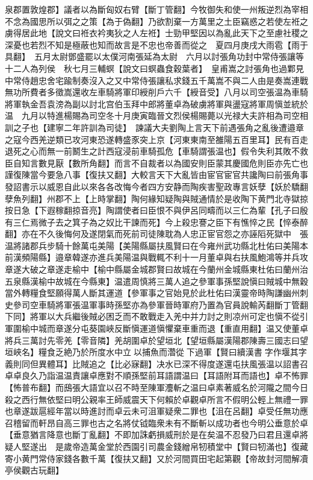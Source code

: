泉郡置敦煌郡】議者以為斷匈奴右臂【斷丁管翻】今牧御失和使一州叛逆烈為宰相不念為國思所以弭之之策【為于偽翻】乃欲割棄一方萬里之土臣竊惑之若使左袵之虜得居此地【說文曰袵衣衿夷狄之人左袵】士勁甲堅因以為亂此天下之至慮社稷之深憂也若烈不知是極蔽也知而故言是不忠也帝善而從之　夏四月庚戌大雨雹【雨于具翻】　五月太尉鄧盛罷以太僕河南張延為太尉　六月以討張角功封中常侍張讓等十二人為列侯　秋七月三輔螟【說文曰螟蟲食穀葉者】　皇甫嵩之討張角也過鄴見中常侍趙忠舍宅踰制奏沒入之又中常侍張讓私求錢五千萬嵩不與二人由是奏嵩連戰無功所費者多徵嵩還收左車騎將軍印綬削戶六千【綬音受】八月以司空張温為車騎將軍執金吾袁滂為副以討北宫伯玉拜中郎將董卓為破虜將軍與盪寇將軍周愼並統於温　九月以特進楊賜為司空冬十月庚寅臨晉文烈侯楊賜薨以光禄大夫許相為司空相訓之子也【建寧二年許訓為司徒】　諫議大夫劉陶上言天下前遇張角之亂後遭邉章之寇今西羌逆類已攻河東恐遂轉盛豕突上京【河東東南至雒陽五百里耳】民有百走退死之心而無一前鬭生之計西寇浸前車騎孤危【車騎謂張温也】假令失利其敗不救臣自知言數見厭【數所角翻】而言不自裁者以為國安則臣蒙其慶國危則臣亦先亡也謹復陳當今要急八事【復扶又翻】大較言天下大亂皆由宦官宦官共讒陶曰前張角事發詔書示以威恩自此以來各各改悔今者四方安静而陶疾害聖政專言妖孽【妖於驕翻孽魚列翻】州郡不上【上時掌翻】陶何緣知疑陶與賊通情於是收陶下黄門北寺獄掠按日急【下遐稼翻掠音亮】陶謂使者曰臣恨不與伊呂同疇而以三仁為輩【孔子曰殷有三仁焉微子去之箕子為之奴比干諫而死】今上殺忠謇之臣下有憔悴之民【悴泰醉翻】亦在不久後悔何及遂閉氣而死前司徒陳耽為人忠正宦官怨之亦誣䧟死獄中　張温將諸郡兵步騎十餘萬屯美陽【美陽縣屬扶風賢曰在今雍州武功縣北杜佑曰美陽本前漢頻陽縣】邉章韓遂亦進兵美陽温與戰輒不利十一月董卓與右扶風鮑鴻等并兵攻章遂大破之章遂走榆中【榆中縣屬金城郡賢曰故城在今蘭州金城縣東杜佑曰蘭州治五泉縣漢榆中故城在今縣東】温遣周慎將三萬人追之參軍事孫堅說愼曰賊城中無穀當外轉糧食堅願得萬人斷其運道【參軍事之官始見於此杜佑曰漢靈帝時陶謙幽州刺史參司空車騎將軍張温軍事時孫堅亦為參軍晉時軍府乃置為官員說輸芮翻斷丁管翻下同】將軍以大兵繼後賊必困乏而不敢戰走入羌中并力討之則凉州可定也愼不從引軍圍榆中城而章遂分屯葵園峽反斷愼運道愼懼棄車重而退【重直用翻】温又使董卓將兵三萬討先零羌【零音隣】羌胡圍卓於望垣北【望垣縣屬漢陽郡陳壽三國志曰望垣峽名】糧食乏絶乃於所度水中立以捕魚而濳從下過軍【賢曰續漢書字作堰其字義則同但異體耳】比賊追之【比必寐翻】决水已深不得度遂還屯扶風張温以詔書召卓卓良久乃詣温温責讓卓應對不順孫堅前耳語謂温曰【耳語附耳而語也】卓不怖罪【怖普布翻】而䲭張大語宜以召不時至陳軍灋斬之温曰卓素著威名於河隴之間今日殺之西行無依堅曰明公親率王師威震天下何賴於卓觀卓所言不假明公輕上無禮一罪也章遂跋扈經年當以時進討而卓云未可沮軍疑衆二罪也【沮在呂翻】卓受任無功應召稽留而軒昂自高三罪也古之名將仗钺臨衆未有不斷斬以成功者也今明公垂意於卓【垂意猶言降意也斷丁亂翻】不即加誅虧損威刑於是在矣温不忍發乃曰君且還卓將疑人堅遂出　是歲帝造萬金堂於西園引司農金錢繒帛牣積堂中【賢曰牣滿也】復藏寄小黄門常侍家錢各數千萬【復扶又翻】又於河間買田宅起第觀【帝故封河間解凟亭侯觀古玩翻】

